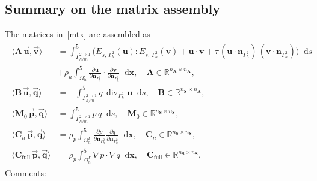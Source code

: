 \documentclass[12pt]{article}
\newcommand{\vect}[1]{\boldsymbol{\mathbf{#1}}}
\newcommand*\diff{\mathop{}\!\mathrm{d}}
\DeclareMathOperator{\Div}{div}
\begin{document}
\subsection{Summary on the matrix assembly}

The matrices in~\eqref{mtx} are assembled as
\begin{align}\begin{split}\label{mtx_exact}
	\langle \vect A\,\vec{\vect u}, \vec{\vect v} \rangle &= 
		\int^5_{\Gamma_{h/m}^{2 \to 1}} \big( E_{s,\,\Gamma_{h}^2}(\vect u) : E_{s,\,\Gamma_{h}^2}(\vect v) + \vect u\cdot\vect v + \tau\,(\vect u\cdot\vect n_{\Gamma_{h}^2})\,(\vect v\cdot\vect n_{\Gamma_{h}^2}) \big) \diff{s} \\
	&
		+ \rho_u \int^5_{\Omega_h^{\Gamma}} \frac{\partial \vect u}{\partial\vect n_{\Gamma_{h}^2}}\cdot\frac{\partial \vect v}{\partial\vect n_{\Gamma_{h}^2}} \diff{\vect x}, \quad \vect A \in \mathbb R^{n_{\vect A} \times n_{\vect A}},\\
	\langle \vect B\,\vec{\vect u}, \vec{\vect q} \rangle &= 
		-\int^5_{\Gamma_{h/m}^{2 \to 1}} q\,\Div_{\Gamma_{h}^2} \vect u \diff{s}, \quad \vect B \in \mathbb R^{n_{\vect S} \times n_{\vect A}},\\
	\langle \vect M_0\,\vec{\vect p}, \vec{\vect q} \rangle &=
		\int^5_{\Gamma_{h/m}^{2 \to 1}} p\,q \diff{s}, \quad \vect M_0 \in \mathbb R^{n_{\vect S} \times n_{\vect S}},\\
	\langle \vect C_n\,\vec{\vect p}, \vec{\vect q} \rangle &=
		\rho_p \int^5_{\Omega^{\Gamma}_h} \frac{\partial p}{\partial\vect n_{\Gamma_{h}^2}} \frac{\partial q}{\partial\vect n_{\Gamma_{h}^2}} \diff{\vect x}, \quad \vect C_n \in \mathbb R^{n_{\vect S} \times n_{\vect S}},\\
	\langle \vect C_{\text{full}}\,\vec{\vect p}, \vec{\vect q} \rangle &=
		\rho_p \int^5_{\Omega^{\Gamma}_h} \nabla p \cdot \nabla q \diff{\vect x}, \quad \vect C_{\text{full}} \in \mathbb R^{n_{\vect S} \times n_{\vect S}},		 
\end{split}\end{align}
Comments:
\end{document}
